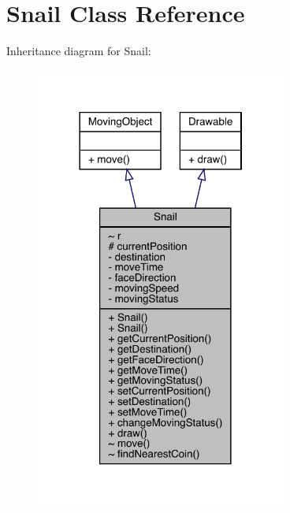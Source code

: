 \hypertarget{class_snail}{}\section{Snail Class Reference}
\label{class_snail}


Inheritance diagram for Snail\+:
\nopagebreak
\begin{figure}[H]
\begin{center}
\leavevmode
\includegraphics[width=234pt]{class_snail__inherit__graph}
\end{center}
\end{figure}


